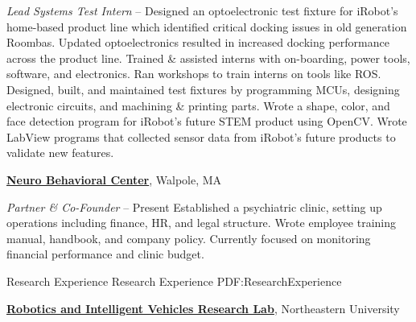 \documentclass[letterpaper,MMMyyyy,nonstopmode]{simpleresumecv}
\begin{document}
\begin{Body}
\Gap
\textit{Lead Systems Test Intern}
\hfill
{} -- 
\BulletItem
Designed an optoelectronic test fixture for iRobot's home-based product line which identified critical docking issues in old generation Roombas. Updated optoelectronics resulted in increased docking performance across the product line.
\BulletItem
Trained \& assisted interns with on-boarding, power tools, software, and electronics. Ran workshops to train interns on tools like ROS.
\BulletItem
Designed, built, and maintained test fixtures by programming MCUs, designing electronic circuits, and machining \& printing parts.
\BulletItem
Wrote a shape, color, and face detection program for iRobot's future STEM product using OpenCV.
\BulletItem
Wrote LabView programs that collected sensor data from iRobot's future products to validate new features.
\SectionSpace


\Entry
\href{https://www.nbchealthcare.com/}
{\textbf{Neuro Behavioral Center}},
Walpole, MA

\Gap
\textit{Partner \& Co-Founder}
\hfill
{} -- Present
\BulletItem
Established a psychiatric clinic, setting up operations including finance, HR, and legal structure.
\BulletItem
Wrote employee training manual, handbook, and company policy.
\BulletItem
Currently focused on monitoring financial performance and clinic budget.


\Section
{Research Experience}
{Research Experience}
{PDF:ResearchExperience}

\Entry
\href{http://robot.neu.edu/}
{\textbf{Robotics and Intelligent Vehicles Research Lab}},
Northeastern University


\end{Body}
\end{document}
